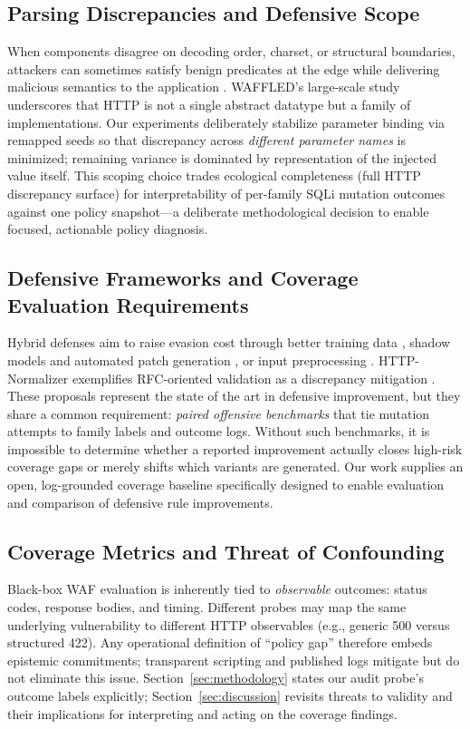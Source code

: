 \subsection{Parsing Discrepancies and Defensive Scope}
When components disagree on decoding order, charset, or structural boundaries, attackers can sometimes satisfy benign predicates at the edge while delivering malicious semantics to the application \cite{akhavani2025waffled}. WAFFLED's large-scale study underscores that HTTP is not a single abstract datatype but a family of implementations. Our experiments deliberately stabilize parameter binding via remapped seeds so that discrepancy across \emph{different parameter names} is minimized; remaining variance is dominated by representation of the injected value itself. This scoping choice trades ecological completeness (full HTTP discrepancy surface) for interpretability of per-family SQLi mutation outcomes against one policy snapshot---a deliberate methodological decision to enable focused, actionable policy diagnosis.

\subsection{Defensive Frameworks and Coverage Evaluation Requirements}
Hybrid defenses aim to raise evasion cost through better training data \cite{elebiary2026wamm}, shadow models and automated patch generation \cite{wu2025wafbooster}, or input preprocessing \cite{zhang2026bwafsql}. HTTP-Normalizer exemplifies RFC-oriented validation as a discrepancy mitigation \cite{httpnormalizer}. These proposals represent the state of the art in defensive improvement, but they share a common requirement: \emph{paired offensive benchmarks} that tie mutation attempts to family labels and outcome logs. Without such benchmarks, it is impossible to determine whether a reported improvement actually closes high-risk coverage gaps or merely shifts which variants are generated. Our work supplies an open, log-grounded coverage baseline specifically designed to enable evaluation and comparison of defensive rule improvements.

\subsection{Coverage Metrics and Threat of Confounding}
Black-box WAF evaluation is inherently tied to \emph{observable} outcomes: status codes, response bodies, and timing. Different probes may map the same underlying vulnerability to different HTTP observables (e.g., generic 500 versus structured 422). Any operational definition of ``policy gap'' therefore embeds epistemic commitments; transparent scripting and published logs mitigate but do not eliminate this issue. Section~\ref{sec:methodology} states our audit probe's outcome labels explicitly; Section~\ref{sec:discussion} revisits threats to validity and their implications for interpreting and acting on the coverage findings.
